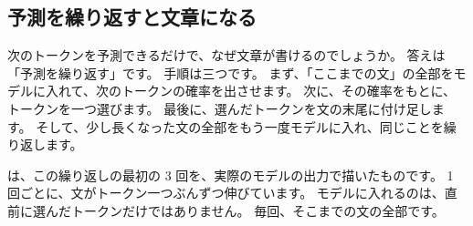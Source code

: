 \subsection*{予測を繰り返すと文章になる}

次のトークンを予測できるだけで、なぜ文章が書けるのでしょうか。
答えは「予測を繰り返す」です。
手順は三つです。
まず、「ここまでの文」の全部をモデルに入れて、次のトークンの確率を出させます。
次に、その確率をもとに、トークンを一つ選びます。
最後に、選んだトークンを文の末尾に付け足します。
そして、少し長くなった文の全部をもう一度モデルに入れ、同じことを繰り返します。

は、この繰り返しの最初の 3 回を、実際のモデルの出力で描いたものです。
1 回ごとに、文がトークン一つぶんずつ伸びています。
モデルに入れるのは、直前に選んだトークンだけではありません。
毎回、そこまでの文の全部です。

